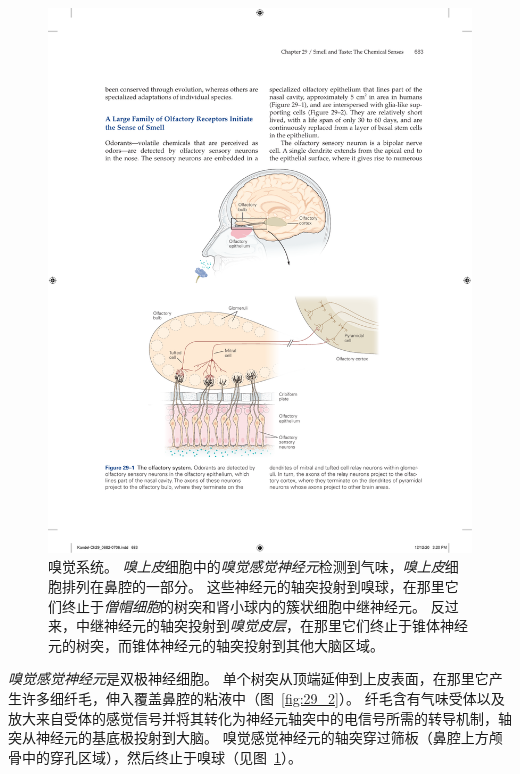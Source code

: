 \begin{figure}[htbp]
	\centering
	\includegraphics[width=0.7\linewidth]{chap29/fig_29_1}
	\caption{嗅觉系统。
	\textit{嗅上皮}细胞中的\textit{嗅觉感觉神经元}检测到气味，\textit{嗅上皮}细胞排列在鼻腔的一部分。
	这些神经元的轴突投射到嗅球，在那里它们终止于\textit{僧帽细胞}的树突和肾小球内的簇状细胞中继神经元。
	反过来，中继神经元的轴突投射到\textit{嗅觉皮层}，在那里它们终止于锥体神经元的树突，而锥体神经元的轴突投射到其他大脑区域。}
	\label{fig:29_1}
\end{figure}


\textit{嗅觉感觉神经元}是双极神经细胞。
单个树突从顶端延伸到上皮表面，在那里它产生许多细纤毛，伸入覆盖鼻腔的粘液中（图~\ref{fig:29_2}）。
纤毛含有气味受体以及放大来自受体的感觉信号并将其转化为神经元轴突中的电信号所需的转导机制，轴突从神经元的基底极投射到大脑。
嗅觉感觉神经元的轴突穿过筛板（鼻腔上方颅骨中的穿孔区域），然后终止于嗅球（见图~\ref{fig:29_1}）。


